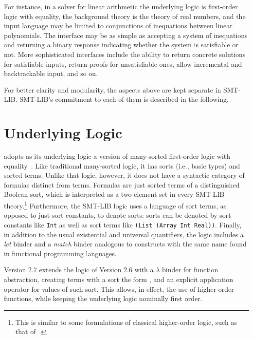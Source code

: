 For instance, in a solver for linear arithmetic
the underlying logic is first-order logic with equality,
the background theory is the theory of real numbers, and
the input language may be limited to conjunctions of inequations 
between linear polynomials.
The interface may be as simple as accepting a system
of inequations and returning a binary response indicating 
whether the system is satisfiable or not.
More sophisticated interfaces include
the ability to return concrete solutions for satisfiable inputs,
return proofs for unsatisfiable ones,
allow incremental and backtrackable input, and so on.

For better clarity and modularity, 
the aspects above are kept separate in SMT-LIB.
SMT-LIB's commitment to each of them is described in the following.


\section{Underlying Logic}


adopts as its underlying logic a version of many-sorted first-order logic 
with equality~\cite{Man-MSL-93,Gal-86,Hen-01}.
Like traditional many-sorted logic, it has sorts (i.e., basic types) 
and sorted terms.
Unlike that logic, however,
it does not have a syntactic category of formulas distinct from terms.
Formulas are just sorted terms of a distinguished Boolean sort,
which is interpreted as a two-element set in every SMT-LIB theory.\footnote{This is similar
to some formulations of classical higher-order logic, such as that of~\cite{andrews86}.}
Furthermore, the SMT-LIB logic uses a language of sort terms,
as opposed to just sort constants, to denote sorts:
sorts can be denoted by sort constants like \texttt{Int}
as well as sort terms like
\texttt{(List (Array Int Real))}.
Finally,
in addition to the usual existential and universal quantifiers, 
the logic includes a \emph{let} binder
and a \emph{match} binder
analogous to constructs with the same name
found in functional programming languages.

\begin{newver}
Version 2.7 extends the logic of Version 2.6 with a $\lambda$ binder
for function abstraction, creating terms with a sort the form
, and an explicit application operator 
for values of such sort. 
This allows, in effect, the use of higher-order functions,
while keeping the underlying logic nominally first order.
\end{newver}

